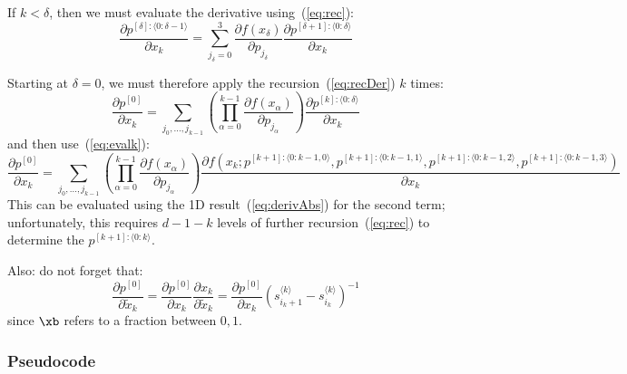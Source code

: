 \documentclass[11pt]{article}
\begin{document}
If $k < \delta$, then we must evaluate the derivative using~(\ref{eq:rec}):
\begin{equation}
\frac{\partial p^{[\delta]: \langle 0:\delta-1 \rangle} }{\partial x_k} 
=
\sum_{j_\delta=0}^3 
\frac{
\partial f(x_\delta)
}{
\partial p_{j_\delta}
}
\frac{\partial p^{[\delta+1]: \langle 0:\delta \rangle}
}{
\partial x_k
}
\label{eq:recDer}
\end{equation}

Starting at $\delta=0$, we must therefore apply the recursion~(\ref{eq:recDer}) $k$ times:
\begin{equation}
\frac{\partial p^{[0]} }{\partial x_k} 
=
\sum_{j_0, \dots, j_{k-1}}
\left (
\prod_{\alpha=0}^{k-1}
\frac{
\partial f(x_\alpha)
}{
\partial p_{j_\alpha}
}
\right )
\frac{\partial p^{[k]: \langle 0:\delta \rangle}
}{
\partial x_k
}
\end{equation}
and then use~(\ref{eq:evalk}):
\begin{equation}
\frac{\partial p^{[0]} }{\partial x_k} 
=
\sum_{j_0, \dots, j_{k-1}}
\left (
\prod_{\alpha=0}^{k-1}
\frac{
\partial f(x_\alpha)
}{
\partial p_{j_\alpha}
}
\right )
\frac{\partial 
f \left ( 
x_{k} ; 
p^{[k+1]: \langle 0:k-1,0 \rangle},
p^{[k+1]: \langle 0:k-1,1 \rangle},
p^{[k+1]: \langle 0:k-1,2 \rangle},
p^{[k+1]: \langle 0:k-1,3 \rangle}
\right ) 
}{
\partial x_k
}
\end{equation}
This can be evaluated using the 1D result~(\ref{eq:derivAbs}) for the second term; unfortunately, this requires $d- 1 - k$ levels of further recursion~(\ref{eq:rec}) to determine the $p^{[k+1]: \langle 0:k \rangle}$.

Also: do not forget that:
\begin{equation}
\frac{\partial p^{[0]}}{\partial \tilde{x}_k} 
= \frac{\partial p^{[0]}}{\partial x_k} \frac{\partial x_k}{\partial \tilde{x}_k} 
= \frac{\partial p^{[0]}}{\partial x_k} \left ( s_{i_k+1}^{\langle k \rangle} - s_{i_k}^{\langle k \rangle} \right )^{-1}
\end{equation}
since $\xb$ refers to a fraction between $0,1$.


\subsubsection{Pseudocode}

\end{document}
